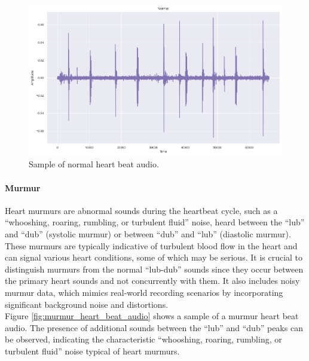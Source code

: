 \begin{figure}[h]
    \centering
    \includegraphics[width=\columnwidth]{../images/normal_heart_beat_audio.png}
    \caption{Sample of normal heart beat audio.}
    \label{fig:normal_heart_beat_audio}
\end{figure}

\paragraph{Murmur}
Heart murmurs are abnormal sounds during the heartbeat cycle, such as a ``whooshing, roaring, rumbling, or turbulent fluid'' noise, heard between
the ``lub'' and ``dub'' (systolic murmur) or between ``dub'' and ``lub'' (diastolic murmur).
These murmurs are typically indicative of turbulent blood flow in the heart and can signal various heart conditions, some of which may be serious.
It is crucial to distinguish murmurs from the normal ``lub-dub'' sounds since they occur between the primary heart sounds and not concurrently with them.
It also includes noisy murmur data, which mimics real-world recording scenarios by incorporating significant background noise and distortions.\\
Figure \ref{fig:murmur_heart_beat_audio} shows a sample of a murmur heart beat audio.
The presence of additional sounds between the ``lub'' and ``dub'' peaks can be observed, indicating the characteristic
``whooshing, roaring, rumbling, or turbulent fluid'' noise typical of heart murmurs.

